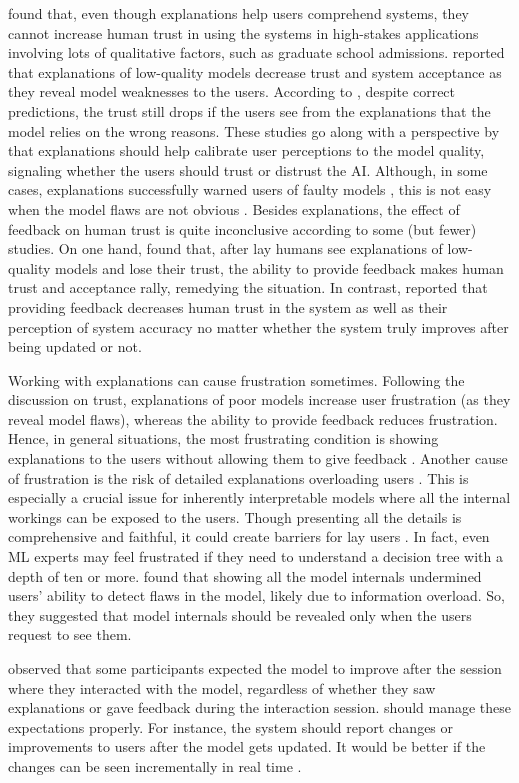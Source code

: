found that, even though explanations help users comprehend systems, they cannot increase human trust in using the systems in high-stakes applications involving lots of qualitative factors, such as graduate school admissions.    
 reported that explanations of low-quality models decrease trust and system acceptance as they reveal model weaknesses to the users.
According to , despite correct predictions, the trust still drops if the users see from the explanations that the model relies on the wrong reasons. 
These studies go along with a perspective by  that explanations should help calibrate user perceptions to the model quality, signaling whether the users should trust or distrust the AI.
Although, in some cases, explanations successfully warned users of faulty models , this is not easy when the model flaws are not obvious . 
Besides explanations, the effect of feedback on human trust is quite inconclusive according to some (but fewer) studies.
On one hand, 
 found that, after lay humans see explanations of low-quality models and lose their trust, the ability to provide feedback makes human trust and acceptance rally, remedying the situation.
In contrast,  reported that providing feedback decreases human trust in the system as well as their perception of system accuracy no matter whether the system truly improves after being updated or not.

Working with explanations can cause frustration 
sometimes.
Following the discussion on trust, explanations of poor models increase user frustration (as they reveal model flaws), whereas the ability to provide feedback reduces frustration. Hence, in general situations, the most frustrating condition is showing explanations to the users without allowing them to give feedback . 
Another cause of frustration is the risk of detailed explanations overloading users .
This is especially a crucial issue for inherently interpretable models where all the internal workings can be exposed to the users.
Though presenting all the details is comprehensive and faithful, it could create
barriers for lay users .
In fact, even ML experts may feel frustrated if they need to understand a decision tree with a depth of ten or more.
 found that showing all the model internals undermined users' ability to detect flaws in the model, likely due to information overload. So, they suggested that model internals should be revealed only when the users request to see them.

 observed that some participants expected the model to improve after the session where they interacted with the model, regardless of whether they saw explanations or gave feedback during the interaction session. 
\EBHD should manage these expectations properly. 
For instance, the system should report changes or improvements to users after the model gets updated.
It would be better if the changes can be seen incrementally in real time .

